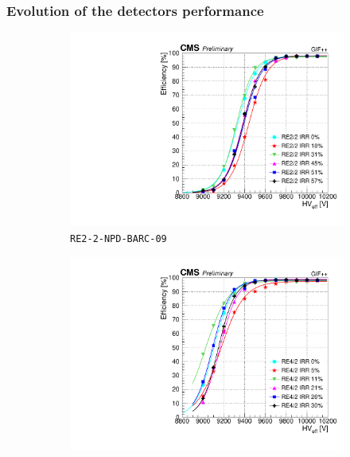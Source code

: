 \normalsize
	
	\subsubsection{Evolution of the detectors performance}
	\label{chapt5:sssec:perfevol}
	
	\begin{figure}[H]
    	\begin{subfigure}{0.5\linewidth}
			\centering
    		\includegraphics[width = \linewidth]{fig/chapt5/OFF-efficiency_vs_HV_RE2_2.pdf}
        	\caption{\label{fig:GIFpp_eff_vs_HV_OFF:A} \texttt{RE2-2-NPD-BARC-09}}
    	\end{subfigure}
    	\begin{subfigure}{0.5\linewidth}
			\centering
    		\includegraphics[width = \linewidth]{fig/chapt5/OFF-efficiency_vs_HV_RE4_2.pdf}

\end{subfigure}
\end{figure}
